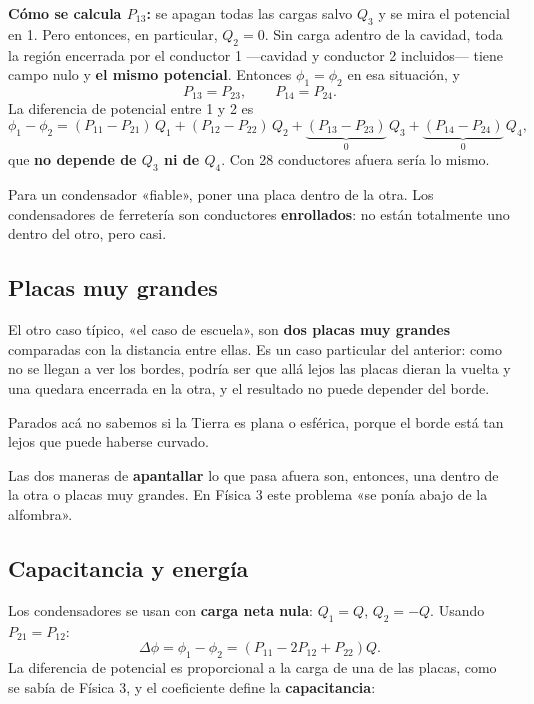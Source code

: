 \documentclass[12pt,a4paper]{article}
\begin{document}
\textbf{Cómo se calcula $P_{13}$:} se apagan todas las cargas salvo $Q_3$ y se
mira el potencial en 1. Pero entonces, en particular, \textbf{$Q_2 = 0$}. Sin
carga adentro de la cavidad, toda la región encerrada por el conductor 1
---cavidad y conductor 2 incluidos--- tiene campo nulo y \textbf{el mismo
potencial}. Entonces $\phi_1 = \phi_2$ en esa situación, y
\[
P_{13} = P_{23},\qquad P_{14} = P_{24}.
\]
La diferencia de potencial entre 1 y 2 es
\[
\phi_1-\phi_2 = (P_{11}-P_{21})\,Q_1 + (P_{12}-P_{22})\,Q_2
+ \underbrace{(P_{13}-P_{23})}_{0}\,Q_3 + \underbrace{(P_{14}-P_{24})}_{0}\,Q_4 ,
\]
que \textbf{no depende de $Q_3$ ni de $Q_4$}. Con 28 conductores afuera sería lo
mismo.

\begin{notebox}
Para un condensador «fiable», poner una placa dentro de la otra. Los
condensadores de ferretería son conductores \textbf{enrollados}: no están
totalmente uno dentro del otro, pero casi.
\end{notebox}

\subsection{Placas muy grandes}

El otro caso típico, «el caso de escuela», son \textbf{dos placas muy grandes}
comparadas con la distancia entre ellas. Es un caso particular del anterior: como
no se llegan a ver los bordes, podría ser que allá lejos las placas dieran la
vuelta y una quedara encerrada en la otra, y el resultado no puede depender del
borde.

\begin{notebox}
Parados acá no sabemos si la Tierra es plana o esférica, porque el borde está tan
lejos que puede haberse curvado.
\end{notebox}

Las dos maneras de \textbf{apantallar} lo que pasa afuera son, entonces, una
dentro de la otra o placas muy grandes. En Física 3 este problema «se ponía abajo
de la alfombra».

\subsection{Capacitancia y energía}

Los condensadores se usan con \textbf{carga neta nula}: $Q_1 = Q$, $Q_2 = -Q$.
Usando $P_{21} = P_{12}$:
\[
\Delta\phi = \phi_1-\phi_2 = \left(P_{11} - 2P_{12} + P_{22}\right) Q .
\]
La diferencia de potencial es proporcional a la carga de una de las placas, como
se sabía de Física 3, y el coeficiente define la \textbf{capacitancia}:
\end{document}
